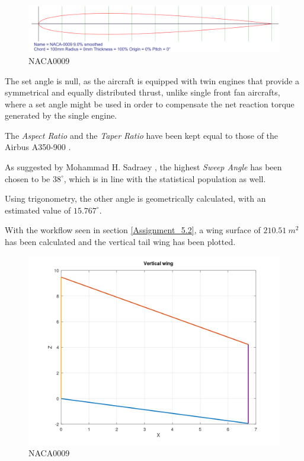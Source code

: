 \documentclass{article}
\begin{document}
\begin{figure}[h!]
    \centering
    \includegraphics[width=\textwidth]{Sources/Plots_and_Pictures/NACA0009.png}
    \caption{NACA0009 \autocite{Airfoiltools}}
    \label{NACA0009_vert}
\end{figure}

The set angle is null, as the aircraft is equipped with twin engines that provide a symmetrical and 
equally distributed thrust, unlike single front fan aircrafts, where a set angle might be used
in order to compensate the net reaction torque generated by the single engine. 

The \textit{Aspect Ratio} and the \textit{Taper Ratio} have been kept equal to those of the Airbus A350-900 \autocite{Airbus_A350-900}.

As suggested by Mohammad H. Sadraey \autocite{Sadraey_Mohammad}, the highest \textit{Sweep Angle} has been
chosen to be $38^{\circ}$, which is in line with the statistical population as well. 

Using trigonometry, the other angle is geometrically calculated, with an estimated value of $15.767^{\circ}$. 
\clearpage 

With the workflow seen in section \ref{Assignment_5.2}, a wing surface of $210.51 \ m^2$ has been calculated
and the vertical tail wing has been plotted.

\begin{figure}[h!]
    \centering
    \includegraphics[width=\textwidth]{Sources/Plots_and_Pictures/Vertical_Wing.png}
    \caption{NACA0009}
    \label{vertical_wing}
\end{figure}
\end{document}
